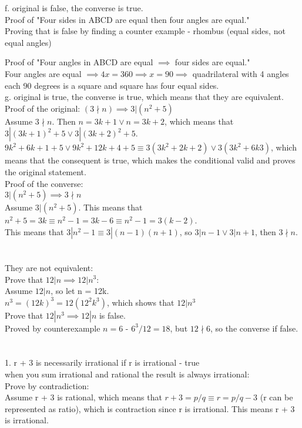 \documentclass{article}
\begin{document}
f. original is false, the converse is true.\\
Proof of "Four sides in ABCD are equal then four angles are equal."\\
Proving that is false by finding a counter example - rhombus (equal sides, not equal angles) 

Proof of "Four angles in ABCD are equal $\implies$ four sides are equal."\\
Four angles are equal $\implies 4x = 360 \implies x = 90 \implies$ quadrilateral with 4 angles each 90 degrees is a square and square has four equal sides.\\

g. original is true, the converse is true, which means that they are equivalent.\\
Proof of the original: $ (3 \nmid n) \implies 3 | (n^2 + 5)$\\
Assume $3 \nmid n$. Then $n = 3k + 1 \vee n = 3k+2$, which means that $3 | (3k+1)^2 + 5 \vee 3 | (3k+2)^2 + 5$.\\
$9k^2 + 6k + 1 + 5 \vee 9k^2 + 12k + 4 + 5 \equiv 3(3k^2 + 2k + 2) \vee 3(3k^2 + 6k 3)$, which means that the consequent is true, which makes the conditional valid and proves the original statement.\\

Proof of the converse:\\
$3 | (n^2 + 5) \implies 3 \nmid n$\\
Assume $3 | (n^2 + 5)$. This means that $n^2 + 5 = 3k \equiv n^2 - 1 = 3k - 6 \equiv n^2 - 1 = 3(k-2)$.\\
This means that $3 | n^2 - 1  \equiv 3| (n-1)(n+1)$, so $3 | n-1  \vee 3 | n+1$, then $3 \nmid n$.

\section{}
They are not equivalent:\\
Prove that $12|n \implies 12|n^3$:\\
Assume $12|n$, so let n = 12k.\\
$n^3 = (12k)^3 = 12(12^2k^3)$, which shows that $12|n^3$\\
Prove that $12|n^3 \implies 12|n$ is false.\\
Proved by counterexample $n = 6$ - $6^3 / 12 = 18$, but $12 \nmid 6 $, so the converse if false.\\

\section{}
1. r + 3 is necessarily irrational if r is irrational - true\\
when you sum irrational and rational the result is always irrational:\\
Prove by contradiction:\\
Assume r + 3 is rational, which means that $r + 3 = p/q \equiv r = p/q-3$ (r can be represented as ratio), which is contraction since r is irrational. This means r + 3 is irrational.\\
\end{document}
